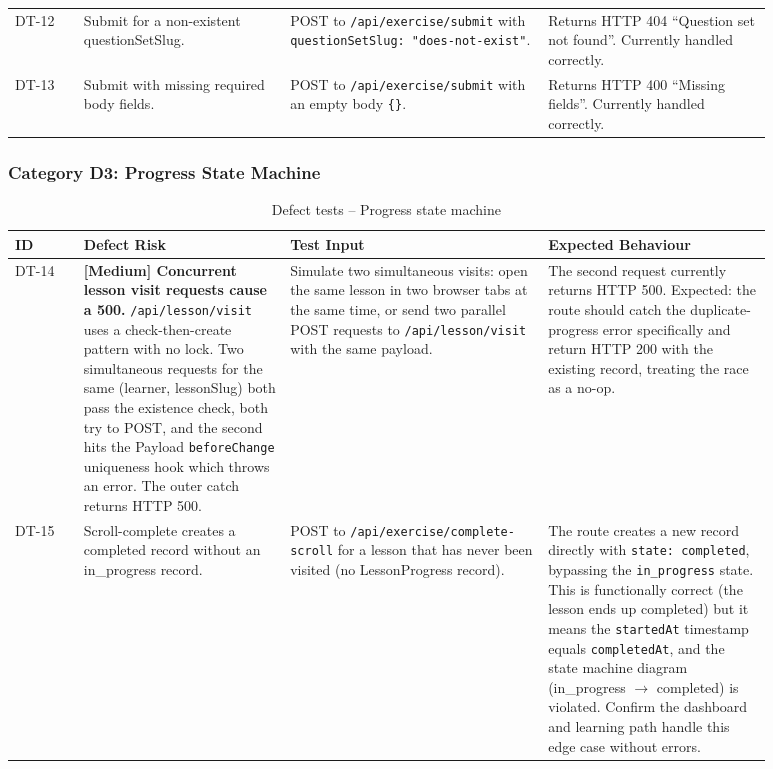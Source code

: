 \begin{longtable}{p{0.08\linewidth} p{0.24\linewidth} p{0.30\linewidth} p{0.26\linewidth}}
DT-12 & Submit for a non-existent questionSetSlug. & POST to \texttt{/api/exercise/submit} with \texttt{questionSetSlug: "does-not-exist"}. & Returns HTTP 404 ``Question set not found''. Currently handled correctly. \\
DT-13 & Submit with missing required body fields. & POST to \texttt{/api/exercise/submit} with an empty body \texttt{\{\}}. & Returns HTTP 400 ``Missing fields''. Currently handled correctly. \\
\bottomrule
\end{longtable}

\subsubsection{Category D3: Progress State Machine}

\begin{longtable}{p{0.08\linewidth} p{0.24\linewidth} p{0.30\linewidth} p{0.26\linewidth}}
\caption{Defect tests -- Progress state machine}\\
\toprule
ID & Defect Risk & Test Input & Expected Behaviour \\
\midrule
\endhead
DT-14 & \textbf{[Medium] Concurrent lesson visit requests cause a 500.} \texttt{/api/lesson/visit} uses a check-then-create pattern with no lock. Two simultaneous requests for the same (learner, lessonSlug) both pass the existence check, both try to POST, and the second hits the Payload \texttt{beforeChange} uniqueness hook which throws an error. The outer catch returns HTTP 500. & Simulate two simultaneous visits: open the same lesson in two browser tabs at the same time, or send two parallel POST requests to \texttt{/api/lesson/visit} with the same payload. & The second request currently returns HTTP 500. Expected: the route should catch the duplicate-progress error specifically and return HTTP 200 with the existing record, treating the race as a no-op. \\
DT-15 & Scroll-complete creates a completed record without an in\_progress record. & POST to \texttt{/api/exercise/complete-scroll} for a lesson that has never been visited (no LessonProgress record). & The route creates a new record directly with \texttt{state: completed}, bypassing the \texttt{in\_progress} state. This is functionally correct (the lesson ends up completed) but it means the \texttt{startedAt} timestamp equals \texttt{completedAt}, and the state machine diagram (in\_progress $\rightarrow$ completed) is violated. Confirm the dashboard and learning path handle this edge case without errors. \\

\end{longtable}
